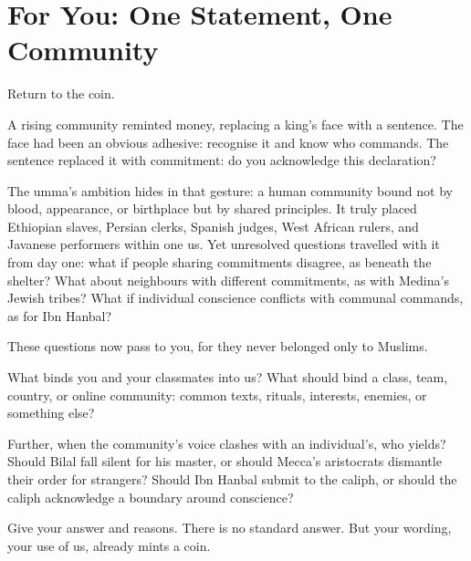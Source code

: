 \section{For You: One Statement, One Community}
Return to the coin.

A rising community reminted money, replacing a king's face with a sentence. The face had been an obvious adhesive: recognise it and know who commands. The sentence replaced it with commitment: do you acknowledge this declaration?

The umma's ambition hides in that gesture: a human community bound not by blood, appearance, or birthplace but by shared principles. It truly placed Ethiopian slaves, Persian clerks, Spanish judges, West African rulers, and Javanese performers within one us. Yet unresolved questions travelled with it from day one: what if people sharing commitments disagree, as beneath the shelter? What about neighbours with different commitments, as with Medina's Jewish tribes? What if individual conscience conflicts with communal commands, as for Ibn Hanbal?

These questions now pass to you, for they never belonged only to Muslims.

What binds you and your classmates into us? What should bind a class, team, country, or online community: common texts, rituals, interests, enemies, or something else?

Further, when the community's voice clashes with an individual's, who yields? Should Bilal fall silent for his master, or should Mecca's aristocrats dismantle their order for strangers? Should Ibn Hanbal submit to the caliph, or should the caliph acknowledge a boundary around conscience?

Give your answer and reasons. There is no standard answer. But your wording, your use of us, already mints a coin.
